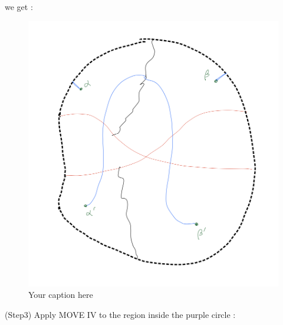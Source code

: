 we get :

\begin{figure}[H] %
    \centering
    \includegraphics[width=\linewidth]{diagrams/definition10/5.png} %
    \caption{Your caption here}
    \label{fig:your-label}
\end{figure}

(Step3) Apply MOVE \RN{4} to the region inside the purple circle :

